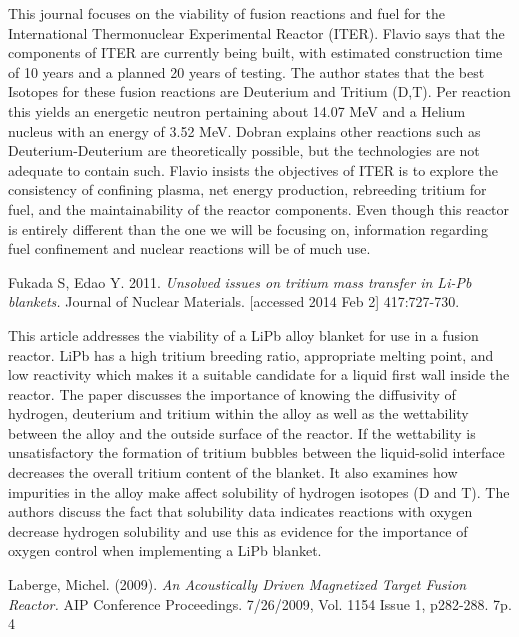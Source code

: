 \documentclass[12pt]{article}
\begin{document}
\begin{singlespace}
\begin{adjustwidth}{2.5em}{0pt}
This journal focuses on the viability of fusion reactions and fuel for the International Thermonuclear Experimental Reactor (ITER).  Flavio says that the components of ITER are currently being built, with estimated construction time of 10 years and a planned 20 years of testing.  The author states that the best Isotopes for these fusion reactions are Deuterium and Tritium (D,T).  Per reaction this yields an energetic neutron pertaining about 14.07 MeV and a Helium nucleus with an energy of 3.52 MeV.  Dobran explains other reactions such as Deuterium-Deuterium are theoretically possible, but the technologies are not adequate to contain such.  Flavio insists the objectives of ITER is to explore the consistency of confining plasma, net energy production, rebreeding tritium for fuel, and the maintainability of the reactor components.  Even though this reactor is entirely different than the one we will be focusing on, information regarding fuel confinement and nuclear reactions will be of much use.    \newline
\end{adjustwidth}



\noindent
Fukada S, Edao Y. 2011. \textit{Unsolved issues on tritium mass transfer in Li-Pb blankets.} Journal of Nuclear Materials. [accessed 2014 Feb 2] 417:727-730.



\begin{adjustwidth}{2.5em}{0pt}
This article addresses the viability of a LiPb alloy blanket for use in a fusion reactor.  LiPb has a high tritium breeding ratio, appropriate melting point, and low reactivity which makes it a suitable candidate for a liquid first wall inside the reactor.  The paper discusses the importance of knowing the diffusivity of hydrogen, deuterium and tritium within the alloy as well as the wettability between the alloy and the outside surface of the reactor.  If the wettability is unsatisfactory the formation of tritium bubbles between the liquid-solid interface decreases the overall tritium content of the blanket.  It also examines how impurities in the alloy make affect solubility of hydrogen isotopes (D and T).  The authors discuss the fact that solubility data indicates reactions with oxygen decrease hydrogen solubility and use this as evidence for the importance of oxygen control when implementing a LiPb blanket.
\end{adjustwidth}
\newpage
\noindent
Laberge, Michel. (2009).  \textit{An Acoustically Driven Magnetized Target Fusion Reactor.}  AIP Conference Proceedings.  7/26/2009, Vol. 1154 Issue 1, p282-288. 7p. 4




\end{singlespace}
\end{document}
